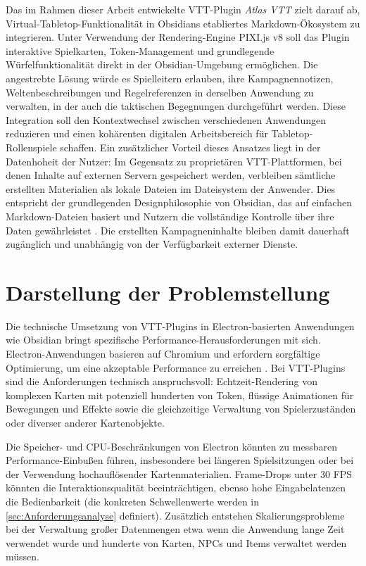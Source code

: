 Das im Rahmen dieser Arbeit entwickelte \ac{VTT}-Plugin \textit{Atlas \ac{VTT}} zielt darauf ab, Virtual-Tabletop-Funktionalität in Obsidians etabliertes Markdown-Ökosystem zu integrieren. Unter Verwendung der Rendering-Engine PIXI.js v8 soll das Plugin interaktive Spielkarten, Token-Management und grundlegende Würfelfunktionalität direkt in der Obsidian-Umgebung ermöglichen. Die angestrebte Lösung würde es Spielleitern erlauben, ihre Kampagnennotizen, Weltenbeschreibungen und Regelreferenzen in derselben Anwendung zu verwalten, in der auch die taktischen Begegnungen durchgeführt werden. Diese Integration soll den Kontextwechsel zwischen verschiedenen Anwendungen reduzieren und einen kohärenten digitalen Arbeitsbereich für Tabletop-Rollenspiele schaffen. Ein zusätzlicher Vorteil dieses Ansatzes liegt in der Datenhoheit der Nutzer: Im Gegensatz zu proprietären \ac{VTT}-Plattformen, bei denen Inhalte auf externen Servern gespeichert werden, verbleiben sämtliche erstellten Materialien als lokale Dateien im Dateisystem der Anwender. Dies entspricht der grundlegenden Designphilosophie von Obsidian, das auf einfachen Markdown-Dateien basiert und Nutzern die vollständige Kontrolle über ihre Daten gewährleistet \autocite{ObsidianAbout2024}. Die erstellten Kampagneninhalte bleiben damit dauerhaft zugänglich und unabhängig von der Verfügbarkeit externer Dienste.

\section{Darstellung der Problemstellung}
\label{sec:Problemstellung}

Die technische Umsetzung von \ac{VTT}-Plugins in Electron-basierten Anwendungen wie Obsidian bringt spezifische Performance-Herausforderungen mit sich. Electron-Anwendungen basieren auf Chromium und erfordern sorgfältige Optimierung, um eine akzeptable Performance zu erreichen \autocite{ElectronPerformanceGuide2024}. Bei \ac{VTT}-Plugins sind die Anforderungen technisch anspruchsvoll: Echtzeit-Rendering von komplexen Karten mit potenziell hunderten von Token, flüssige Animationen für Bewegungen und Effekte sowie die gleichzeitige Verwaltung von Spielerzuständen oder diverser anderer Kartenobjekte.

Die Speicher- und \ac{CPU}-Beschränkungen von Electron könnten zu messbaren Performance-Einbußen führen, insbesondere bei längeren Spielsitzungen oder bei der Verwendung hochauflösender Kartenmaterialien. Frame-Drops unter 30 \ac{FPS} könnten die Interaktionsqualität beeinträchtigen, ebenso hohe Eingabelatenzen die Bedienbarkeit (die konkreten Schwellenwerte werden in \autoref{sec:Anforderungsanalyse} definiert). Zusätzlich entstehen Skalierungsprobleme bei der Verwaltung großer Datenmengen etwa wenn die Anwendung lange Zeit verwendet wurde und hunderte von Karten, NPCs und Items verwaltet werden müssen.

